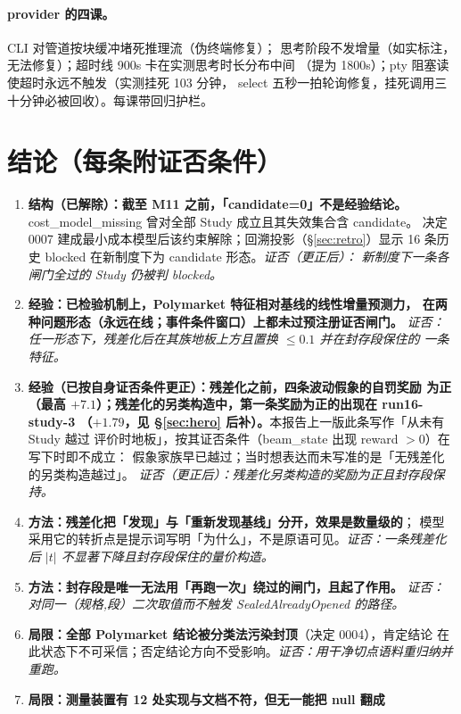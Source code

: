 \documentclass[11pt]{ctexart}
\begin{document}
\paragraph{provider 的四课。}CLI 对管道按块缓冲堵死推理流（伪终端修复）；
思考阶段不发增量（如实标注，无法修复）；超时线 900s 卡在实测思考时长分布中间
（提为 1800s）；pty 阻塞读使超时永远不触发（实测挂死 103 分钟，
select 五秒一拍轮询修复，挂死调用三十分钟必被回收）。每课带回归护栏。

\section{结论（每条附证否条件）}\label{sec:conclusions}
\begin{enumerate}
\item \textbf{结构（已解除）：截至 M11 之前，「candidate=0」不是经验结论。}
cost\_model\_missing 曾对全部 Study 成立且其失效集合含 candidate。
决定 0007 建成最小成本模型后该约束解除；回溯投影（\S\ref{sec:retro}）显示
16 条历史 blocked 在新制度下为 candidate 形态。\emph{证否（更正后）：
新制度下一条各闸门全过的 Study 仍被判 blocked。}
\item \textbf{经验：已检验机制上，Polymarket 特征相对基线的线性增量预测力，
在两种问题形态（永远在线；事件条件窗口）上都未过预注册证否闸门。}
\emph{证否：任一形态下，残差化后在其族地板上方且置换 $\le0.1$ 并在封存段保住的
一条特征。}
\item \textbf{经验（已按自身证否条件更正）：残差化之前，四条波动假象的自罚奖励
为正（最高 $+7.1$）；残差化的另类构造中，第一条奖励为正的出现在 run16-study-3
（$+1.79$，见 \S\ref{sec:hero} 后补）。}本报告上一版此条写作「从未有 Study 越过
评价时地板」，按其证否条件（beam\_state 出现 reward $>0$）在写下时即不成立：
假象家族早已越过；当时想表达而未写准的是「无残差化的另类构造越过」。
\emph{证否（更正后）：残差化另类构造的奖励为正且封存段保持。}
\item \textbf{方法：残差化把「发现」与「重新发现基线」分开，效果是数量级的}；
模型采用它的转折点是提示词写明「为什么」，不是原语可见。\emph{证否：一条残差化后
$|t|$ 不显著下降且封存段保住的量价构造。}
\item \textbf{方法：封存段是唯一无法用「再跑一次」绕过的闸门，且起了作用。}
\emph{证否：对同一（规格,段）二次取值而不触发 SealedAlreadyOpened 的路径。}
\item \textbf{局限：全部 Polymarket 结论被分类法污染封顶}（决定 0004），肯定结论
在此状态下不可采信；否定结论方向不受影响。\emph{证否：用干净切点语料重归纳并重跑。}
\item \textbf{局限：测量装置有 12 处实现与文档不符，但无一能把 null 翻成
}
\end{enumerate}
\end{document}
